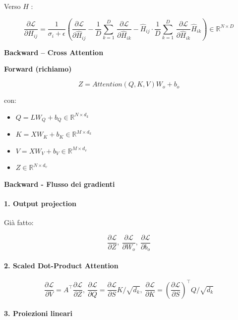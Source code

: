 \documentclass[
  11pt,
]{article}
\begin{document}
Verso \(H\) :

\[\frac{\partial\mathcal{L}}{\partial H_{ij}} = \frac{1}{\sigma_{i} + \epsilon}\left( \frac{\partial\mathcal{L}}{\partial{\widehat{H}}_{ij}} - \frac{1}{D}\sum_{k = 1}^{D}\,\frac{\partial\mathcal{L}}{\partial{\widehat{H}}_{ik}} - {\widehat{H}}_{ij} \cdot \frac{1}{D}\sum_{k = 1}^{D}\,\frac{\partial\mathcal{L}}{\partial{\widehat{H}}_{ik}}{\widehat{H}}_{ik} \right) \in \mathbb{R}^{N \times D}\]

\textbf{Backward -- Cross Attention}

\textbf{Forward (richiamo)}

\[Z = Attention(Q,K,V)W_{o} + b_{o}\]

con:

\begin{itemize}
\item
  \(Q = LW_{Q} + b_{Q} \in \mathbb{R}^{N \times d_{k}}\)
\item
  \(K = XW_{K} + b_{K} \in \mathbb{R}^{M \times d_{k}}\)
\item
  \(V = XW_{V} + b_{V} \in \mathbb{R}^{M \times d_{v}}\)
\item
  \(Z \in \mathbb{R}^{N \times d_{v}}\)
\end{itemize}

\textbf{Backward - Flusso dei gradienti}

\paragraph{1. Output projection}

Già fatto:

\[\frac{\partial\mathcal{L}}{\partial Z},\ \frac{\partial\mathcal{L}}{\partial W_{o}},\ \frac{\partial\mathcal{L}}{\partial b_{o}}\]

\paragraph{2. Scaled Dot-Product Attention}

\[\frac{\partial\mathcal{L}}{\partial V} = A^{\top}\frac{\partial\mathcal{L}}{\partial Z},\ \frac{\partial\mathcal{L}}{\partial Q} = \frac{\partial\mathcal{L}}{\partial S}K/\sqrt{d_{k}},\ \frac{\partial\mathcal{L}}{\partial K} = \left( \frac{\partial\mathcal{L}}{\partial S} \right)^{\top}Q/\sqrt{d_{k}}\]

\paragraph{3. Proiezioni lineari}
\end{document}
